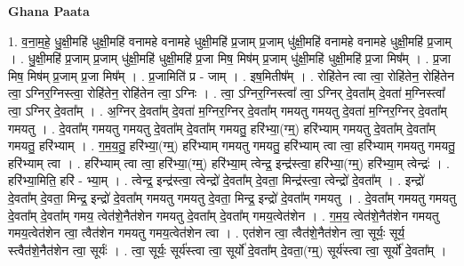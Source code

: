 \documentclass[17pt]{extarticle}
\begin{document}
\textbf{Ghana Paata } \newline

1. व॒ना॒म॒हे॒ धु॒क्षी॒महि॑ धुक्षी॒महि॑ वनामहे वनामहे धुक्षी॒महि॑ प्र॒जाम् प्र॒जाम् धु॑क्षी॒महि॑ वनामहे वनामहे धुक्षी॒महि॑ प्र॒जाम् । . धु॒क्षी॒महि॑ प्र॒जाम् प्र॒जाम् धु॑क्षी॒महि॑ धुक्षी॒महि॑ प्र॒जा मिष॒ मिष॑म् प्र॒जाम् धु॑क्षी॒महि॑ धुक्षी॒महि॑ प्र॒जा मिष᳚म् । . प्र॒जा मिष॒ मिष॑म् प्र॒जाम् प्र॒जा मिष᳚म् । . प्र॒जामिति॑ प्र - जाम् । . इष॒मितीष᳚म् । . रोहि॑तेन त्वा त्वा॒ रोहि॑तेन॒ रोहि॑तेन त्वा॒ ऽग्निर॒ग्निस्त्वा॒ रोहि॑तेन॒ रोहि॑तेन त्वा॒ ऽग्निः । . त्वा॒ ऽग्निर॒ग्निस्त्वा᳚ त्वा॒ ऽग्निर् दे॒वता᳚म् दे॒वता॑ म॒ग्निस्त्वा᳚ त्वा॒ ऽग्निर् दे॒वता᳚म् । . अ॒ग्निर् दे॒वता᳚म् दे॒वता॑ म॒ग्निर॒ग्निर् दे॒वता᳚म् गमयतु गमयतु दे॒वता॑ म॒ग्निर॒ग्निर् दे॒वता᳚म् गमयतु । . दे॒वता᳚म् गमयतु गमयतु दे॒वता᳚म् दे॒वता᳚म् गमयतु॒ हरि॑भ्या॒(ग्म्॒) हरि॑भ्याम् गमयतु दे॒वता᳚म् दे॒वता᳚म् गमयतु॒ हरि॑भ्याम् । . ग॒म॒य॒तु॒ हरि॑भ्या॒(ग्म्॒) हरि॑भ्याम् गमयतु गमयतु॒ हरि॑भ्याम् त्वा त्वा॒ हरि॑भ्याम् गमयतु गमयतु॒ हरि॑भ्याम् त्वा । . हरि॑भ्याम् त्वा त्वा॒ हरि॑भ्या॒(ग्म्॒) हरि॑भ्या॒म् त्वेन्द्र॒ इन्द्र॑स्त्वा॒ हरि॑भ्या॒(ग्म्॒) हरि॑भ्या॒म् त्वेन्द्रः॑ । . हरि॑भ्या॒मिति॒ हरि॑ - भ्या॒म् । . त्वेन्द्र॒ इन्द्र॑स्त्वा॒ त्वेन्द्रो॑ दे॒वता᳚म् दे॒वता॒ मिन्द्र॑स्त्वा॒ त्वेन्द्रो॑ दे॒वता᳚म् । . इन्द्रो॑ दे॒वता᳚म् दे॒वता॒ मिन्द्र॒ इन्द्रो॑ दे॒वता᳚म् गमयतु गमयतु दे॒वता॒ मिन्द्र॒ इन्द्रो॑ दे॒वता᳚म् गमयतु । . दे॒वता᳚म् गमयतु गमयतु दे॒वता᳚म् दे॒वता᳚म् गमय॒ त्वेत॑शे॒नैत॑शेन गमयतु दे॒वता᳚म् दे॒वता᳚म् गमय॒त्वेत॑शेन । . ग॒म॒य॒ त्वेत॑शे॒नैत॑शेन गमयतु गमय॒त्वेत॑शेन त्वा॒ त्वैत॑शेन गमयतु गमय॒त्वेत॑शेन त्वा । . एत॑शेन त्वा॒ त्वैत॑शे॒नैत॑शेन त्वा॒ सूर्यः॒ सूर्य॒ स्त्वैत॑शे॒नैत॑शेन त्वा॒ सूर्यः॑ । . त्वा॒ सूर्यः॒ सूर्य॑स्त्वा त्वा॒ सूर्यो॑ दे॒वता᳚म् दे॒वता॒(ग्म्॒) सूर्य॑स्त्वा त्वा॒ सूर्यो॑ दे॒वता᳚म् । \newline
\end{document}

